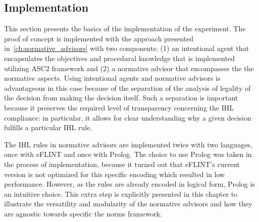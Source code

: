 %
\subsection{Implementation}
This section presents the basics of the implementation of the experiment. The proof of concept is implemented with the approach presented in~\ref{ch:normative_advisors} with two components: (1) an intentional agent that encapsulates the objectives and procedural knowledge that is implemented utilizing ASC2 framework and (2) a normative advisor that encompasses the the normative aspects. Using intentional agents and normative advisors is advantageous in this case because of the separation of the analysis of legality of the decision from making the decision itself. Such a separation is important because it preserves the required level of transparency concerning the IHL compliance: in particular, it allows for clear understanding why a given decision fulfills a particular IHL rule. %

The IHL rules in normative advisors are implemented twice with two languages, once with eFLINT and once with Prolog. The choice to use Prolog was taken in the process of implementation, because it turned out that eFLINT's current version is not optimized for this specific encoding which resulted in low performance. However, as the rules are already encoded in logical form, Prolog is an intuitive choice. This extra step is explicitly presented in this chapter to illustrate the versatility and modularity of the normative advisors and how they are agnostic towards specific the norms framework.


